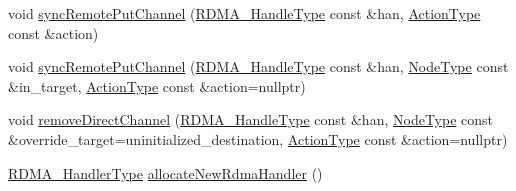 \begin{DoxyCompactItemize}
\item 
void \hyperlink{structvt_1_1rdma_1_1_r_d_m_a_manager_a9b6fb7fac7c6b534659705cf4ad20658}{sync\+Remote\+Put\+Channel} (\hyperlink{namespacevt_a10442579ec4e7ebef223818e64bcf908}{R\+D\+M\+A\+\_\+\+Handle\+Type} const \&han, \hyperlink{namespacevt_ae0a5a7b18cc99d7b732cb4d44f46b0f3}{Action\+Type} const \&action)
\item 
void \hyperlink{structvt_1_1rdma_1_1_r_d_m_a_manager_aae382995709cd7827f256f9d5f3e45e4}{sync\+Remote\+Put\+Channel} (\hyperlink{namespacevt_a10442579ec4e7ebef223818e64bcf908}{R\+D\+M\+A\+\_\+\+Handle\+Type} const \&han, \hyperlink{namespacevt_a866da9d0efc19c0a1ce79e9e492f47e2}{Node\+Type} const \&in\+\_\+target, \hyperlink{namespacevt_ae0a5a7b18cc99d7b732cb4d44f46b0f3}{Action\+Type} const \&action=nullptr)
\item 
void \hyperlink{structvt_1_1rdma_1_1_r_d_m_a_manager_a9767f9beafd9a352ae2b9f0a189f7346}{remove\+Direct\+Channel} (\hyperlink{namespacevt_a10442579ec4e7ebef223818e64bcf908}{R\+D\+M\+A\+\_\+\+Handle\+Type} const \&han, \hyperlink{namespacevt_a866da9d0efc19c0a1ce79e9e492f47e2}{Node\+Type} const \&override\+\_\+target=uninitialized\+\_\+destination, \hyperlink{namespacevt_ae0a5a7b18cc99d7b732cb4d44f46b0f3}{Action\+Type} const \&action=nullptr)
\item 
\hyperlink{namespacevt_a9530efb893c0f3846e8ac5f0507e0f49}{R\+D\+M\+A\+\_\+\+Handler\+Type} \hyperlink{structvt_1_1rdma_1_1_r_d_m_a_manager_a9b393c6dbd360c0b7bfb899e3fc0451b}{allocate\+New\+Rdma\+Handler} ()
\end{DoxyCompactItemize}
